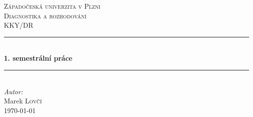 	
\linespread{1}

\begin{titlepage}
	
	\newcommand{\HRule}{\rule{\linewidth}{0.5mm}} %
	
	\center{} %
	 
	
	\textsc{\LARGE Západočeská univerzita v Plzni}\\[1.5cm] %
	\textsc{\Large Diagnostika a rozhodování}\\[0.5cm] %
	\textsc{\large KKY/DR}\\[0.5cm] %
	
	
	\HRule{} \\[0.4cm]
	{\huge \bfseries 1. semestrální práce}\\ %
	\HRule{} \\[1.5cm]
	 
	
	\Large \emph{Autor:}\\
	Marek \textsc{Lovčí}\\[3.3cm]
	
	
	{\large \today}\\[2cm] %
	
	

\end{titlepage}
